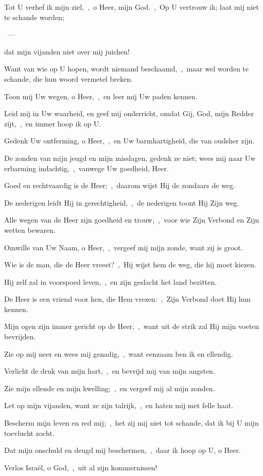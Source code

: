 \documentclass[12pt,twoside,a5paper]{article}
\begin{document}
\begin{halfparskip}
   
\end{halfparskip}

\begin{halfparskip}
   Tot U verhef ik mijn ziel,~\sep\ o Heer, mijn God.~\sep\ Op U vertrouw ik; laat mij niet te schande worden;

  ~--- 

  dat mijn vijanden niet over mij juichen!

  Want van wie op U hopen, wordt niemand beschaamd,~\sep\ maar wel worden te schande, die hun woord vermetel breken.

  Toon mij Uw wegen, o Heer,~\sep\ en leer mij Uw paden kennen.

  Leid mij in Uw waarheid, en geef mij onderricht, omdat Gij, God, mijn Redder zijt,~\sep\ en immer hoop ik op U.

  Gedenk Uw ontferming, o Heer,~\sep\ en Uw barmhartigheid, die van oudsher zijn.

  De zonden van mijn jeugd en mijn misslagen, gedenk ze niet; wees mij naar Uw erbarming indachtig,~\sep\ vanwege Uw goedheid, Heer.

  Goed en rechtvaardig is de Heer;~\sep\ daarom wijst Hij de zondaars de weg.

  De nederigen leidt Hij in gerechtigheid,~\sep\ de nederigen toont Hij Zijn weg.

  Alle wegen van de Heer zijn goedheid en trouw,~\sep\ voor wie Zijn Verbond en Zijn wetten bewaren.

  Omwille van Uw Naam, o Heer,~\sep\ vergeef mij mijn zonde, want zij is groot.

  Wie is de man, die de Heer vreest?~\sep\ Hij wijst hem de weg, die hij moet kiezen.

  Hij zelf zal in voorspoed leven,~\sep\ en zijn geslacht het land bezitten.

  De Heer is een vriend voor hen, die Hem vrezen:~\sep\ Zijn Verbond doet Hij hun kennen.

  Mijn ogen zijn immer gericht op de Heer,~\sep\ want uit de strik zal Hij mijn voeten bevrijden.

  Zie op mij neer en wees mij genadig,~\sep\ want eenzaam ben ik en ellendig.

  Verlicht de druk van mijn hart,~\sep\ en bevrijd mij van mijn angsten.

  Zie mijn ellende en mijn kwelling;~\sep\ en vergeef mij al mijn zonden.

  Let op mijn vijanden, want ze zijn talrijk,~\sep\ en haten mij met felle haat.

  Bescherm mijn leven en red mij;~\sep\ het zij mij niet tot schande, dat ik bij U mijn toevlucht zocht.

  Dat mijn onschuld en deugd mij beschermen,~\sep\ daar ik hoop op U, o Heer.

  Verlos Israël, o God,~\sep\ uit al zijn kommernissen!
\end{halfparskip}
\end{document}

